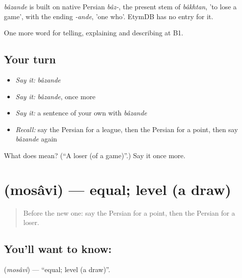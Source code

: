 \begin{cousinweb}
\emph{bâzande} is built on native Persian \emph{bâz-}, the present stem of \emph{bâkhtan}, 'to lose a game', with the ending \emph{-ande}, 'one who'. EtymDB has no entry for it.
\end{cousinweb}

\begin{grammarlens}[title={What you've built}]
One more word for telling, explaining and describing at B1.
\end{grammarlens}

\subsection*{Your turn}
\begin{itemize}
\raggedright
  \item \emph{Say it:} \emph{bâzande}
  \item \emph{Say it:} \emph{bâzande}, once more
  \item \emph{Say it:} a sentence of your own with \emph{bâzande}
  \item \emph{Recall:} say the Persian for a league, then the Persian for a point, then say \emph{bâzande} again
\end{itemize}

\begin{tcolorbox}[breakable,colback=teal!4,colframe=teal!35!black,title={Before you move on}]
What does  mean? (\textquotedblleft{}A loser (of a game)\textquotedblright{}.) Say it once more.
\end{tcolorbox}
\section[\texorpdfstring{\fa{مساوی} (mosâvi)}{مساوی (mosâvi)}]{ (mosâvi) — equal; level (a draw)}

\label{lesson:FA-C513-mosavi}



\begin{quote}
Before the new one: say the Persian for a point, then the Persian for a loser.
\end{quote}

\subsection*{You'll want to know: }
\textbf{} (\emph{mosâvi}) — \textquotedblleft{}equal; level (a draw)\textquotedblright{}.

